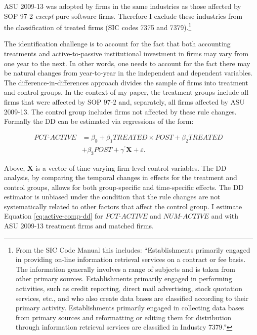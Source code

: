 \documentclass[thesis]{thesis-umich}
\begin{document}
ASU 2009-13 was adopted by firms in the same industries as those affected by SOP 97-2 \emph{except} pure software firms. Therefore I exclude these industries from the classification of treated firms (SIC codes 7375 and 7379).\footnote{From the SIC Code Manual this includes: ``Establishments primarily engaged in providing on-line information retrieval services on a contract or fee basis. The information generally involves a range of subjects and is taken from other primary sources. Establishments primarily engaged in performing activities, such as credit reporting, direct mail advertising, stock quotation services, etc., and who also create data bases are classified according to their primary activity. Establishments primarily engaged in collecting data bases from primary sources and reformatting or editing them for distribution through information retrieval services are classified in Industry 7379.''}

The identification challenge is to account for the fact that both accounting treatments and active-to-passive institutional investment in firms may vary from one year to the next. In other words, one needs to account for the fact there may be natural changes from year-to-year in the independent and dependent variables. The difference-in-differences approach divides the sample of firms into treatment and control groups. In the context of my paper, the treatment groups include all firms that were affected by SOP 97-2 and, separately, all firms affected by ASU 2009-13. The control group includes firms not affected by these rule changes. Formally the DD can be estimated via regressions of the form:

\begin{equation} \label{eq:active-comp-dd} 
\begin{aligned} 
PCT\text{-}ACTIVE &=\beta_{0} + \beta_{1}TREATED \times POST + \beta_{2}TREATED \\&+ \beta_{3}POST + \gamma^{\prime}\mathbf{X} + \varepsilon.
\end{aligned}
\end{equation}

Above, $\mathbf{X}$ is a vector of time-varying firm-level control variables. The DD analysis, by comparing the temporal changes in effects for the treatment and control groups, allows for both group-specific and time-specific effects. The DD estimator is unbiased under the condition that the rule changes are not systematically related to other factors that affect the control group. I estimate Equation \ref{eq:active-comp-dd} for $PCT\text{-}ACTIVE$ and $NUM\text{-}ACTIVE$ and with ASU 2009-13 treatment firms and matched firms.
\end{document}
